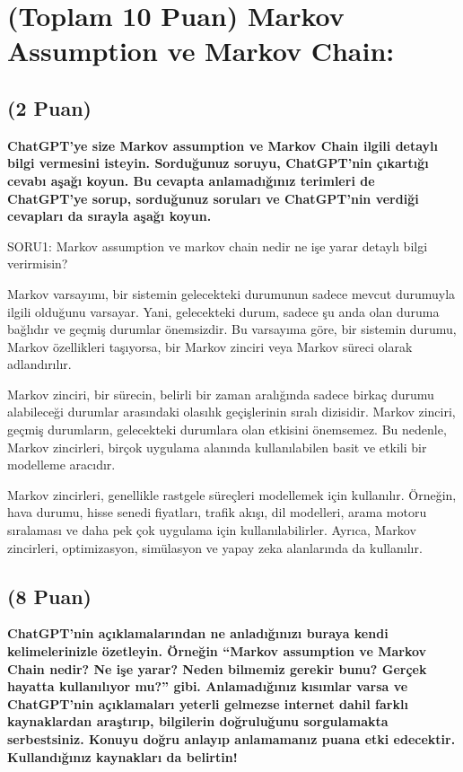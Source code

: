 \documentclass[11pt]{article}
\begin{document}
\section{(Toplam 10 Puan) Markov Assumption ve Markov Chain:}

\subsection{(2 Puan)} \textbf{ChatGPT’ye size Markov assumption ve Markov Chain ilgili detaylı bilgi vermesini isteyin. Sorduğunuz soruyu, ChatGPT'nin çıkartığı cevabı aşağı koyun. Bu cevapta anlamadığınız terimleri de ChatGPT’ye sorup, sorduğunuz soruları ve ChatGPT’nin verdiği cevapları da sırayla aşağı koyun.}

SORU1: Markov assumption ve markov chain nedir ne işe yarar detaylı bilgi verirmisin?

Markov varsayımı, bir sistemin gelecekteki durumunun sadece mevcut durumuyla ilgili olduğunu varsayar. Yani, gelecekteki durum, sadece şu anda olan duruma bağlıdır ve geçmiş durumlar önemsizdir. Bu varsayıma göre, bir sistemin durumu, Markov özellikleri taşıyorsa, bir Markov zinciri veya Markov süreci olarak adlandırılır.

Markov zinciri, bir sürecin, belirli bir zaman aralığında sadece birkaç durumu alabileceği durumlar arasındaki olasılık geçişlerinin sıralı dizisidir. Markov zinciri, geçmiş durumların, gelecekteki durumlara olan etkisini önemsemez. Bu nedenle, Markov zincirleri, birçok uygulama alanında kullanılabilen basit ve etkili bir modelleme aracıdır.

Markov zincirleri, genellikle rastgele süreçleri modellemek için kullanılır. Örneğin, hava durumu, hisse senedi fiyatları, trafik akışı, dil modelleri, arama motoru sıralaması ve daha pek çok uygulama için kullanılabilirler. Ayrıca, Markov zincirleri, optimizasyon, simülasyon ve yapay zeka alanlarında da kullanılır.



\subsection{(8 Puan)} \textbf{ChatGPT’nin açıklamalarından ne anladığınızı buraya kendi kelimelerinizle özetleyin. Örneğin ``Markov assumption ve Markov Chain nedir? Ne işe yarar? Neden bilmemiz gerekir bunu? Gerçek hayatta kullanılıyor mu?'' gibi. Anlamadığınız kısımlar varsa ve ChatGPT’nin açıklamaları yeterli gelmezse internet dahil farklı kaynaklardan araştırıp, bilgilerin doğruluğunu sorgulamakta serbestsiniz. Konuyu doğru anlayıp anlamamanız puana etki edecektir. Kullandığınız kaynakları da belirtin!}
\end{document}
